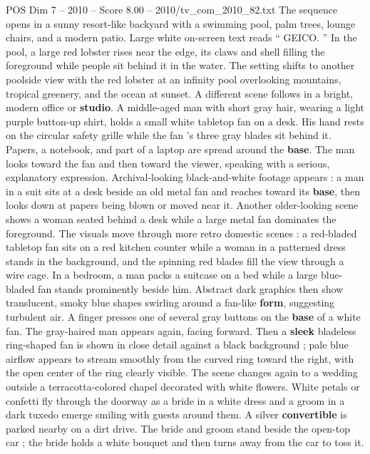 \begin{textsample}{POS Dim 7 – 2010 – Score 8.00 – 2010/tv\_com\_2010\_82.txt}  \label{ex:f7_pos_054}
The sequence opens in a sunny resort-like backyard with a swimming pool, palm trees, lounge chairs, and a modern patio.
Large white on-screen text reads “ GEICO. ” In the pool, a large red lobster rises near the edge, its claws and shell filling the foreground while people sit behind it in the water.
The setting shifts to another poolside view with the red lobster at an infinity pool overlooking mountains, tropical greenery, and the ocean at sunset.
A different scene follows in a bright, modern office or \textbf{studio}.
A middle-aged man with short gray hair, wearing a light purple button-up shirt, holds a small white tabletop fan on a desk.
His hand rests on the circular safety grille while the fan ’s three gray blades sit behind it.
Papers, a notebook, and part of a laptop are spread around the \textbf{base}.
The man looks toward the fan and then toward the viewer, speaking with a serious, explanatory expression.
Archival-looking black-and-white footage appears : a man in a suit sits at a desk beside an old metal fan and reaches toward its \textbf{base}, then looks down at papers being blown or moved near it.
Another older-looking scene shows a woman seated behind a desk while a large metal fan dominates the foreground.
The visuals move through more retro domestic scenes : a red-bladed tabletop fan sits on a red kitchen counter while a woman in a patterned dress stands in the background, and the spinning red blades fill the view through a wire cage.
In a bedroom, a man packs a suitcase on a bed while a large blue-bladed fan stands prominently beside him.
Abstract dark graphics then show translucent, smoky blue shapes swirling around a fan-like \textbf{form}, suggesting turbulent air.
A finger presses one of several gray buttons on the \textbf{base} of a white fan.
The gray-haired man appears again, facing forward.
Then a \textbf{sleek} bladeless ring-shaped fan is shown in close detail against a black background ; pale blue airflow appears to stream smoothly from the curved ring toward the right, with the open center of the ring clearly visible.
The scene changes again to a wedding outside a terracotta-colored chapel decorated with white flowers.
White petals or confetti fly through the doorway as a bride in a white dress and a groom in a dark tuxedo emerge smiling with guests around them.
A silver \textbf{convertible} is parked nearby on a dirt drive.
The bride and groom stand beside the open-top car ; the bride holds a white bouquet and then turns away from the car to toss it.

\end{textsample}
